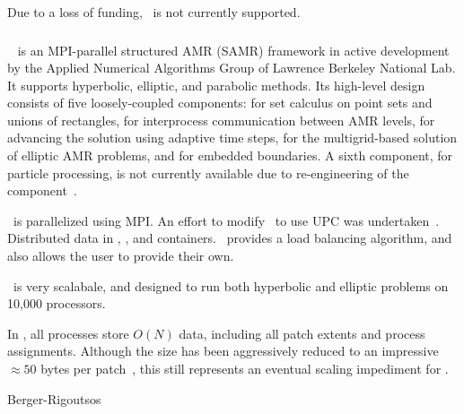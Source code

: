 \documentclass[10pt]{article}
\begin{document}
Due to a loss of funding, \paramesh\ is not currently supported.

\subsubsection{\chombo} \label{sss:chombo}



\chombo~\nocite{CoGr09} is an MPI-parallel structured AMR (SAMR)
framework in active development by the Applied Numerical Algorithms
Group of Lawrence Berkeley National Lab.  It supports hyperbolic,
elliptic, and parabolic methods. Its high-level design consists of
five loosely-coupled components:  for set calculus on
point sets and unions of rectangles,  for interprocess
communication between AMR levels,  for
advancing the solution using adaptive time steps,
 for the multigrid-based solution of elliptic AMR
problems, and  for embedded boundaries.  A sixth
component,  for particle processing, is not
currently available due to re-engineering of the
component~\cite{wwwchombo}.

\chombo\ is parallelized using MPI.  An effort to modify \chombo\ to
use UPC was undertaken~\cite{We04}.
Distributed data in , , and
 containers.  \chombo\ provides a load balancing
algorithm, and also allows the user to provide their own.

\chombo\ is very scalabale, and designed to run both hyperbolic and
elliptic problems on 10,000 processors.

In \chombo, all processes store $O(N)$ data, including all patch
extents and process assignments.  Although the size has been
aggressively reduced to an impressive $\approx 50$ bytes per
patch~\cite{CoKe07}, this still represents an eventual scaling
impediment for \chombo.

Berger-Rigoutsos 




\subsubsection{\samrai} \label{sss:samrai}
\end{document}
